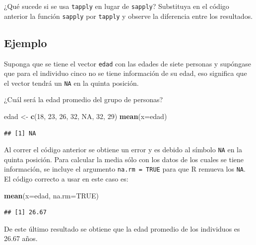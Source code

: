 \documentclass[10pt,]{krantz}
\makeatletter
\newenvironment{Shaded}{\begin{snugshade}}{\end{snugshade}}
\newcommand{\KeywordTok}[1]{\textcolor[rgb]{0.13,0.29,0.53}{\textbf{{#1}}}}
\newcommand{\DataTypeTok}[1]{\textcolor[rgb]{0.13,0.29,0.53}{{#1}}}
\newcommand{\DecValTok}[1]{\textcolor[rgb]{0.00,0.00,0.81}{{#1}}}
\newcommand{\StringTok}[1]{\textcolor[rgb]{0.31,0.60,0.02}{{#1}}}
\newcommand{\OtherTok}[1]{\textcolor[rgb]{0.56,0.35,0.01}{{#1}}}
\newcommand{\NormalTok}[1]{{#1}}
\newenvironment{kframe}{%
\medskip{}
\setlength{\fboxsep}{.8em}
 \def\at@end@of@kframe{}%
 \ifinner\ifhmode%
  \def\at@end@of@kframe{\end{minipage}}%
  \begin{minipage}{\columnwidth}%
 \fi\fi%
 \def\FrameCommand##1{\hskip\@totalleftmargin \hskip-\fboxsep
 \colorbox{shadecolor}{##1}\hskip-\fboxsep
     \hskip-\linewidth \hskip-\@totalleftmargin \hskip\columnwidth}%
 \MakeFramed {\advance\hsize-\width
   \@totalleftmargin\z@ \linewidth\hsize
   \@setminipage}}%
 {\par\unskip\endMakeFramed%
 \at@end@of@kframe}
\renewenvironment{Shaded}{\begin{kframe}}{\end{kframe}}
\makeatother
\begin{document}
¿Qué sucede si se usa \texttt{tapply} en lugar de \texttt{sapply}?
Substituya en el código anterior la función \texttt{sapply} por
\texttt{tapply} y observe la diferencia entre los resultados.

\subsection*{Ejemplo}\label{ejemplo-32}


Suponga que se tiene el vector \texttt{edad} con las edades de siete
personas y supóngase que para el individuo cinco no se tiene información
de su edad, eso significa que el vector tendrá un \texttt{NA} en la
quinta posición.

¿Cuál será la edad promedio del grupo de personas?

\begin{Shaded}
\begin{Highlighting}[]
\NormalTok{edad <-}\StringTok{ }\KeywordTok{c}\NormalTok{(}\DecValTok{18}\NormalTok{, }\DecValTok{23}\NormalTok{, }\DecValTok{26}\NormalTok{, }\DecValTok{32}\NormalTok{, }\OtherTok{NA}\NormalTok{, }\DecValTok{32}\NormalTok{, }\DecValTok{29}\NormalTok{)}
\KeywordTok{mean}\NormalTok{(}\DataTypeTok{x=}\NormalTok{edad)}
\end{Highlighting}
\end{Shaded}

\begin{verbatim}
## [1] NA
\end{verbatim}

Al correr el código anterior se obtiene un error y es debido al símbolo
\texttt{NA} en la quinta posición. Para calcular la media sólo con los
datos de los cuales se tiene información, se incluye el argumento
\texttt{na.rm\ =\ TRUE} para que R remueva los \texttt{NA}. El código
correcto a usar en este caso es:

\begin{Shaded}
\begin{Highlighting}[]
\KeywordTok{mean}\NormalTok{(}\DataTypeTok{x=}\NormalTok{edad, }\DataTypeTok{na.rm=}\OtherTok{TRUE}\NormalTok{)}
\end{Highlighting}
\end{Shaded}

\begin{verbatim}
## [1] 26.67
\end{verbatim}

De este último resultado se obtiene que la edad promedio de los
individuos es 26.67 años.
\end{document}
